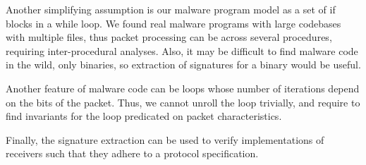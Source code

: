 \documentclass[twocolumn, 11pt]{paper}
\begin{document}
Another simplifying assumption is our malware program model 
as a set of if blocks in a while loop. We found real malware programs with
large codebases with multiple files, thus packet processing can be 
across several procedures, requiring inter-procedural analyses.
Also, it may be difficult to find malware code in the wild, only binaries,
so extraction of signatures for a binary would be useful.

Another feature of malware code can be loops whose number 
of iterations depend on the bits of the packet. Thus, we cannot 
unroll the loop trivially, and require to find invariants for the loop 
predicated on packet characteristics. 

Finally, the signature extraction can be used to verify  
implementations of receivers such that they adhere to 
a protocol specification. 



\end{document}
